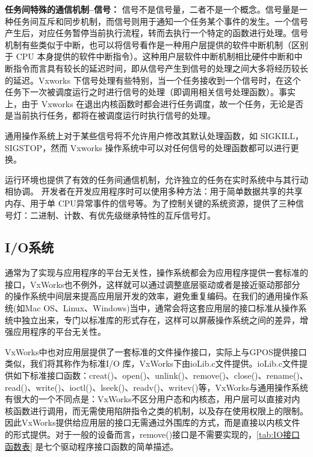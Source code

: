 \textbf{任务间特殊的通信机制--信号：} 信号不是信号量，二者不是一个概念。信号量是一种任务间互斥和同步机制，而信号则用于通知一个任务某个事件的发生。一个信号产生后，对应任务暂停当前执行流程，转而去执行一个特定的函数进行处理。信号机制有些类似于中断，也可以将信号看作是一种用户层提供的软件中断机制（区别于 CPU 本身提供的软件中断指令）。这种用户层软件中断机制相比硬件中断和中断指令而言具有较长的延迟时间，即从信号产生到信号的处理之间大多将经历较长的延迟。Vxworks 下信号处理有些特别，当一个任务接收到一个信号时，在这个任务下一次被调度运行之时进行信号的处理（即调用相关信号处理函数）。事实上，由于 Vxworks 在退出内核函数时都会进行任务调度，故一个任务，无论是否是当前执行任务，都将在被调度运行时执行信号的处理。

	通用操作系统上对于某些信号将不允许用户修改其默认处理函数，如 SIGKILL，SIGSTOP，然而 Vxworks 操作系统中可以对任何信号的处理函数都可以进行更换。
	
	运行环境也提供了有效的任务间通信机制，允许独立的任务在实时系统中与其行动相协调。
开发者在开发应用程序时可以使用多种方法：用于简单数据共享的共享内存、用于单 CPU异常事件的信号等。为了控制关键的系统资源，提供了三种信号灯：二进制、计数、有优先级继承特性的互斥信号灯。

\subsection{I/O系统}
	通常为了实现与应用程序的平台无关性，操作系统都会为应用程序提供一套标准的接口，VxWorks也不例外，这样就可以通过调整底层驱动或者是接近驱动那部分的操作系统中间层来提高应用层开发的效率，避免重复编码。在我们的通用操作系统(如Mac OS、Linux、Windows)当中，通常会将这套应用层的接口标准从操作系统中独立出来，专门以标准库的形式存在，这样可以屏蔽操作系统之间的差异，增强应用程序的平台无关性。
	
	VxWorks中也对应用层提供了一套标准的文件操作接口，实际上与GPOS提供接口类似，我们将其称作为标准I/O 库，VxWorks下由ioLib.c文件提供。ioLib.c文件提供如下标准接口函数：creat()、open()、unlink()、remove()、close()、rename()、read()、write()、ioctl()、lseek()、readv()、writev()等\cite{BSP开发人员指南}，VxWorks与通用操作系统有很大的一个不同点是：VxWorks不区分用户态和内核态，用户层可以直接对内核函数进行调用，而无需使用陷阱指令之类的机制，以及存在使用权限上的限制。因此VxWorks提供给应用层的接口无需通过外围库的方式，而是直接以内核文件的形式提供。对于一般的设备而言，remove()接口是不需要实现的，\autoref{tab:IO接口函数表} 是七个驱动程序接口函数的简单描述。

